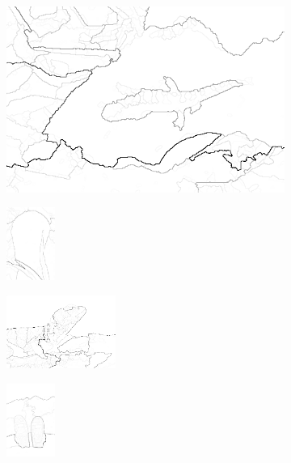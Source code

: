\documentclass[journal]{IEEEtran}
\begin{document}
\begin{figure}[!ht]
        
    \begin{subfigure}[t]{\textwidth+20pt\relax}
    	\centering
    	\includegraphics[width=\dimexpr\linewidth-20pt\relax]{175083_4nn_higra} 
    \end{subfigure}      
    \begin{subfigure}[b]{0.23\textwidth}
    	\centering
        \includegraphics[height=67.68857pt]{101084_4nn_higra}
    \end{subfigure}
    \begin{subfigure}[b]{0.23\textwidth}
    	\centering
        \includegraphics[height=67.68857pt]{41096_4nn_higra}
    \end{subfigure}
    \begin{subfigure}[b]{0.23\textwidth}
    	\centering
        \includegraphics[height=67.68857pt]{2018_4nn_higra}
    \end{subfigure} \\ \vspace{-5pt} 
    

\end{figure}
\end{document}
